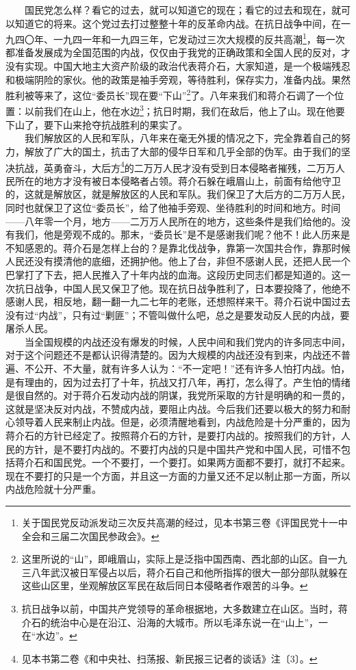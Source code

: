 \documentclass[cn,11pt,chinese]{elegantbook}
\begin{document}
　　国民党怎么样？看它的过去，就可以知道它的现在；看它的过去和现在，就可以知道它的将来。这个党过去打过整整十年的反革命内战。在抗日战争中间，在一九四〇年、一九四一年和一九四三年，它发动过三次大规模的反共高潮\footnote[1]{ 关于国民党反动派发动三次反共高潮的经过，见本书第三卷《评国民党十一中全会和三届二次国民参政会》。}，每一次都准备发展成为全国范围的内战，仅仅由于我党的正确政策和全国人民的反对，才没有实现。中国大地主大资产阶级的政治代表蒋介石，大家知道，是一个极端残忍和极端阴险的家伙。他的政策是袖手旁观，等待胜利，保存实力，准备内战。果然胜利被等来了，这位“委员长”现在要“下山”\footnote[2]{ 这里所说的“山”，即峨眉山，实际上是泛指中国西南、西北部的山区。自一九三八年武汉被日军侵占以后，蒋介石自己和他所指挥的很大一部分部队就躲在这些山区里，坐观解放区军民在敌后同日本侵略者作艰苦的斗争。}了。八年来我们和蒋介石调了一个位置：以前我们在山上，他在水边\footnote[3]{ 抗日战争以前，中国共产党领导的革命根据地，大多数建立在山区。当时，蒋介石的统治中心是在沿江、沿海的大城市。所以毛泽东说一在“山上”，一在“水边”。}；抗日时期，我们在敌后，他上了山。现在他要下山了，要下山来抢夺抗战胜利的果实了。\\
　　我们解放区的人民和军队，八年来在毫无外援的情况之下，完全靠着自己的努力，解放了广大的国土，抗击了大部的侵华日军和几乎全部的伪军。由于我们的坚决抗战，英勇奋斗，大后方\footnote[4]{ 见本书第二卷《和中央社、扫荡报、新民报三记者的谈话》注〔3〕。}的二万万人民才没有受到日本侵略者摧残，二万万人民所在的地方才没有被日本侵略者占领。蒋介石躲在峨眉山上，前面有给他守卫的，这就是解放区，就是解放区的人民和军队。我们保卫了大后方的二万万人民，同时也就保卫了这位“委员长”，给了他袖手旁观、坐待胜利的时间和地方。时间——八年零一个月，地方——二万万人民所在的地方，这些条件是我们给他的。没有我们，他是旁观不成的。那末，“委员长”是不是感谢我们呢？他不！此人历来是不知感恩的。蒋介石是怎样上台的？是靠北伐战争，靠第一次国共合作，靠那时候人民还没有摸清他的底细，还拥护他。他上了台，非但不感谢人民，还把人民一个巴掌打了下去，把人民推入了十年内战的血海。这段历史同志们都是知道的。这一次抗日战争，中国人民又保卫了他。现在抗日战争胜利了，日本要投降了，他绝不感谢人民，相反地，翻一翻一九二七年的老账，还想照样来干。蒋介石说中国过去没有过“内战”，只有过“剿匪”；不管叫做什么吧，总之是要发动反人民的内战，要屠杀人民。\\
　　当全国规模的内战还没有爆发的时候，人民中间和我们党内的许多同志中间，对于这个问题还不是都认识得清楚的。因为大规模的内战还没有到来，内战还不普遍、不公开、不大量，就有许多人认为：“不一定吧！”还有许多人怕打内战。怕，是有理由的，因为过去打了十年，抗战又打八年，再打，怎么得了。产生怕的情绪是很自然的。对于蒋介石发动内战的阴谋，我党所采取的方针是明确的和一贯的，这就是坚决反对内战，不赞成内战，要阻止内战。今后我们还要以极大的努力和耐心领导着人民来制止内战。但是，必须清醒地看到，内战危险是十分严重的，因为蒋介石的方针已经定了。按照蒋介石的方针，是要打内战的。按照我们的方针，人民的方针，是不要打内战的。不要打内战的只是中国共产党和中国人民，可惜不包括蒋介石和国民党。一个不要打，一个要打。如果两方面都不要打，就打不起来。现在不要打的只是一个方面，并且这一方面的力量又还不足以制止那一方面，所以内战危险就十分严重。\\
\end{document}
